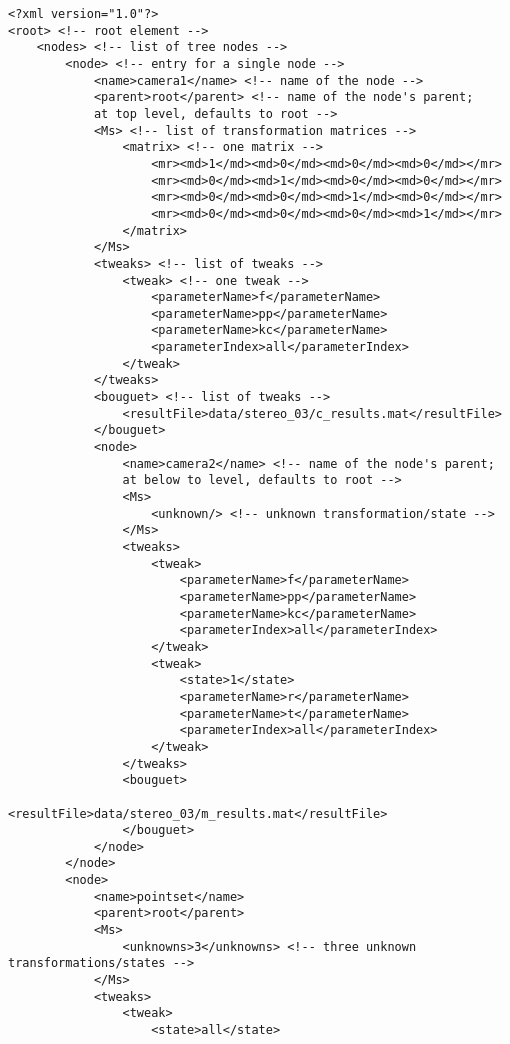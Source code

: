 \begin{verbatim}
<?xml version="1.0"?>
<root> <!-- root element --> 
    <nodes> <!-- list of tree nodes --> 
        <node> <!-- entry for a single node --> 
            <name>camera1</name> <!-- name of the node --> 
            <parent>root</parent> <!-- name of the node's parent; 
            at top level, defaults to root --> 
            <Ms> <!-- list of transformation matrices -->
                <matrix> <!-- one matrix --> 
                    <mr><md>1</md><md>0</md><md>0</md><md>0</md></mr>
                    <mr><md>0</md><md>1</md><md>0</md><md>0</md></mr>
                    <mr><md>0</md><md>0</md><md>1</md><md>0</md></mr>
                    <mr><md>0</md><md>0</md><md>0</md><md>1</md></mr>
                </matrix>
            </Ms>
            <tweaks> <!-- list of tweaks -->
                <tweak> <!-- one tweak -->
                    <parameterName>f</parameterName>
                    <parameterName>pp</parameterName>
                    <parameterName>kc</parameterName>
                    <parameterIndex>all</parameterIndex>
                </tweak>
            </tweaks>
            <bouguet> <!-- list of tweaks -->
            	<resultFile>data/stereo_03/c_results.mat</resultFile>
            </bouguet>
            <node>
                <name>camera2</name> <!-- name of the node's parent; 
                at below to level, defaults to root --> 
                <Ms>
                    <unknown/> <!-- unknown transformation/state -->
                </Ms>
                <tweaks>
                    <tweak>
                        <parameterName>f</parameterName>
                        <parameterName>pp</parameterName>
                        <parameterName>kc</parameterName>
                        <parameterIndex>all</parameterIndex>
                    </tweak>
                    <tweak>
                        <state>1</state>
                        <parameterName>r</parameterName>
                        <parameterName>t</parameterName>
                        <parameterIndex>all</parameterIndex>
                    </tweak>
                </tweaks>
                <bouguet>
                    <resultFile>data/stereo_03/m_results.mat</resultFile>
                </bouguet>
            </node>
        </node>
        <node>
            <name>pointset</name>
            <parent>root</parent>
            <Ms>
                <unknowns>3</unknowns> <!-- three unknown transformations/states -->
            </Ms>
            <tweaks>
                <tweak>
                    <state>all</state>

\end{verbatim}

